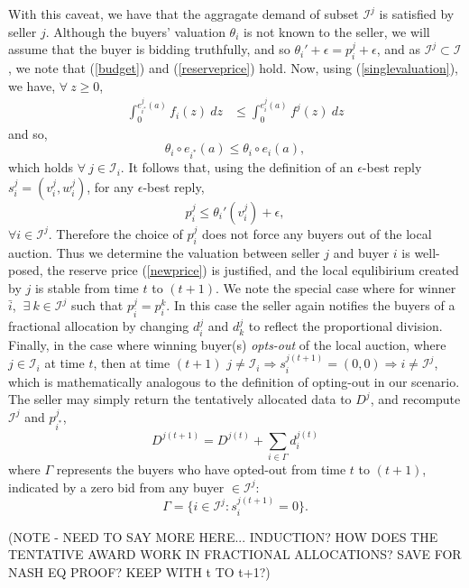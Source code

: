 \documentclass[12pt]{article}
\theoremstyle{definition}
\newcommand{\mcI}{\mathcal{I}}
\begin{document}
\begin{multicols}{2}
With this caveat, we have that the aggragate demand of subset $\mcI^j$ is satisfied by seller $j$.
Although the buyers' valuation $\theta_i$ is not known to the seller, we will assume
that the buyer is bidding truthfully, and so ${\theta_i}' + \epsilon
=p_i^j + \epsilon$, and as $\mcI^j\subset \mcI$, we
note that (\ref{budget}) and (\ref{reserveprice}) hold. Now, using
(\ref{singlevaluation}), we have, $\forall \ z\ge 0$,
\begin{align*}
    \int_0^{e_{i^*}^j(a)} f_{i}(z)\ dz &\le\int_0^{e_i^{j}(a)}
f^{j}(z) \ dz 
\end{align*}
and so,
$$
    \theta_i\circ e_{i^*}(a) \le \theta_i\circ e_i(a),
$$
which holds $\forall \ j \in \mcI_i$.
It follows that, using
the definition of an $\epsilon$-best reply $s_i^j = (v_i^j, w_i^j)$,  
for any $\epsilon$-best reply, 
$$
    p_i^j \le {\theta_i}'(v_i^j) + \epsilon,
$$
$\forall i \in \mcI^j$.
Therefore the choice of $p_i^j$ does not force any buyers out of the local
auction. Thus we determine the valuation between seller
$j$ and buyer $i$ is well-posed, the reserve price (\ref{newprice}) is justified, and the local
equlibirium created by $j$ is stable from time $t$ to $(t+1)$. 
We note the special case where for winner $\bar{i}$, $\ \exists \ k\in\mcI^j$
such that $p_{\bar{i}}^j =
p_i^k$. In this case the seller again notifies the buyers of a fractional
allocation by changing $d_i^j$ and $d_k^j$ to reflect the proportional
division. Finally, in the case where winning buyer(s) \emph{opts-out} of the local
auction, where $j\in\mcI_i$ at time $t$, then at time $(t+1)$ $j\ne \mcI_i \Rightarrow s_i^{j(t+1)} = (0,0) \Rightarrow i \ne
\mcI^j$, which is mathematically analogous to the definition of opting-out in our
scenario. The seller may simply return the tentatively allocated data to $D^j$,
and recompute $\mcI^j$ and $p_{i^*}^j$, 
$$
    D^{j(t+1)} = D^{j(t)} + \displaystyle\sum_{i\in\Gamma} d_i^{j(t)}
$$
where $\Gamma$ represents the buyers who have opted-out from time $t$ to 
$(t+1)$, indicated by a zero bid from any buyer $\in \mcI^j$:
$$
    \Gamma = \lbrace i\in \mcI^j : s_i^{j(t+1)} = 0\rbrace.
$$

(NOTE - NEED TO SAY MORE HERE... INDUCTION? HOW DOES THE TENTATIVE AWARD WORK IN
FRACTIONAL ALLOCATIONS? SAVE FOR NASH EQ PROOF? KEEP WITH t TO t+1?)



\end{multicols}
\end{document}
